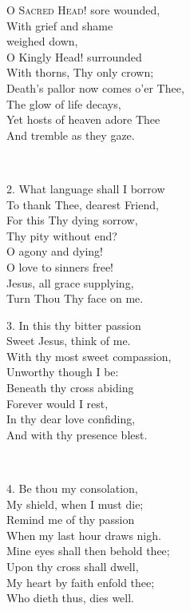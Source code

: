 \noindent\begin{minipage}[t]{0.5\textwidth}
\lettrine{O}{ Sacred Head!} sore wounded,\\
With grief and shame \\
	\phantom{big tab} weighed down,\\
O Kingly Head! surrounded\\
\phantom{tab} With thorns, Thy only crown;\\
Death's pallor now comes o'er Thee,\\
\phantom{tab} The glow of life decays,\\
Yet hosts of heaven adore Thee\\
\phantom{tab} And tremble as they gaze.

	\ 

	\hskip-3pt{2.} 
What language shall I borrow\\
\phantom{tab} To thank Thee, dearest Friend,\\
For this Thy dying sorrow,\\
\phantom{tab} Thy pity without end?\\
O agony and dying!\\
\phantom{tab} O love to sinners free!\\
Jesus, all grace supplying,\\
\phantom{tab} Turn Thou Thy face on me.
\end{minipage}
\begin{minipage}[t]{0.5\textwidth}
3. In this thy bitter passion\\
\phantom{tab} Sweet Jesus, think of me.\\
With thy most sweet compassion,\\
\phantom{tab} Unworthy though I be:\\
Beneath thy cross abiding\\
\phantom{tab} Forever would I rest,\\
In thy dear love confiding,\\
\phantom{tab} And with thy presence blest.

	\ 

4. Be thou my consolation,\\
\phantom{tab} My shield, when I must die;\\
Remind me of thy passion\\
\phantom{tab} When my last hour draws nigh.\\
Mine eyes shall then behold thee;\\
\phantom{tab} Upon thy cross shall dwell,\\
My heart by faith enfold thee;\\
\phantom{tab} Who dieth thus, dies well.
\end{minipage}

\bigskip


